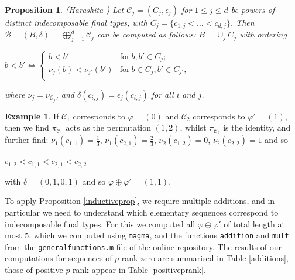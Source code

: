 \documentclass[11pt,table]{amsart}
\newcommand{\union}{\cup} %
\numberwithin{equation}{section}
\newtheorem{prop}[thm]{Proposition}
\theoremstyle{definition}
\newtheorem{eg}[thm]{Example}
\theoremstyle{remark}
\theoremstyle{remark}
\begin{document}
\begin{prop}{({\rm Harashita} \cite[Corollary 4.8 (ii)]{harashita2009configuration})}        
Let $\mathcal{C}_{j} = (C_{j}, \epsilon_{j})$ for $ 1 \le j \le d$ be powers of distinct indecomposable final types, with $ C_j = \{ c_{1,j} < \ldots < c_{d,j} \}$.
Then $\mathcal{B} = (B, \delta) = \bigoplus_{j=1}^{d} \mathcal{C}_{j}$ can be computed as follows: $B =  \union_{j} C_{j}$ with ordering 
    \begin{center}
          $ b < b'  \Leftrightarrow \left\{
	\begin{array}{ll}
		 b < b'   & \mbox{for} \ b,b' \in C_{j};\\
		\nu_{j} (b) < 
    \nu_{j'}(b') & \mbox{for} \ b \in C_{j}, b' \in C_{j'},  \\
	\end{array}
\right. $
\end{center}
where $\nu_j = \nu_{\mathcal{C}_{j}}$, and $\delta(c_{i,j}) = \epsilon_{j} (c_{i,j})$ for all $i$ and $j$.
\end{prop}
\begin{eg}
   If $\mathcal{C}_1$ corresponds to $\varphi =(0)$ and $\mathcal{C}_2$ corresponds to $\varphi' = (1)$, then we find $\pi_{\mathcal{C}_1}$ acts as the permutation $(1,2)$, whilst $\pi_{\mathcal{C}_2}$ is the identity, and further find: $ \nu_1(c_{1,1}) = \frac{1}{3}$, $ \nu_1(c_{2,1}) = \frac{2}{3}$,  $ \nu_2(c_{1,2}) = 0$, $ \nu_2(c_{2,2}) = 1$ and so 
   \begin{center}
       $ c_{1,2} < c_{1,1} < c_{2,1} < c_{2,2}$
   \end{center}
   with $ \delta = (0,1,0,1)$ and so $ \varphi \oplus \varphi' = (1,1)$.
   \end{eg}
To apply Proposition \ref{inductiveprop}, we require multiple additions, and in particular we need to understand which elementary sequences correspond to indecomposable final types. For this we computed all $\varphi \oplus \varphi'$ of total length at most $5$, which we computed using \texttt{magma}, and the functions \texttt{addition} and \texttt{mult} from the \texttt{generalfunctions.m} file of the online repository. The results of our computations for sequences of $p$-rank zero are summarised in Table \ref{additions}, those of positive $p$-rank appear in Table \ref{positiveprank}.
\end{document}
